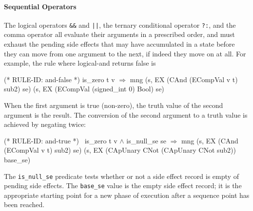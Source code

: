 \documentclass[11pt]{article}
\begin{document}
\paragraph{Sequential Operators}
The logical operators \texttt{\&\&} and \texttt{||}, the ternary
conditional operator \texttt{?:}, and the comma operator all evaluate
their arguments in a prescribed order, and must exhaust the pending
side effects that may have accumulated in a state before they can move
from one argument to the next, if indeed they move on at all.   For
example, the rule where logical-and returns false is
\begin{stdrule}
(* RULE-ID: and-false *)
     is_zero t v
   \(\Rightarrow\)
     mng (s, EX (CAnd (ECompVal v t) sub2) se)
         (s, EX (ECompVal (signed_int 0) Bool) se)
\end{stdrule}%
When the first argument is true (non-zero), the truth value of the
second argument is the result.  The conversion of the second argument
to a truth value is achieved by negating twice:
\begin{stdrule}
(* RULE-ID: and-true *)
     ~is_zero t v \(\land\)
     is_null_se se
   \(\Rightarrow\)
     mng (s, EX (CAnd (ECompVal v t) sub2) se)
         (s, EX (CApUnary CNot (CApUnary CNot sub2)) base_se)
\end{stdrule}
%
%
The \texttt{is_null_se} predicate tests whether or not a side effect
record is empty of pending side effects.
%
The \texttt{base_se} value is the empty side effect record; it is the
appropriate starting point for a new phase of execution after a
sequence point has been reached.
\end{document}
